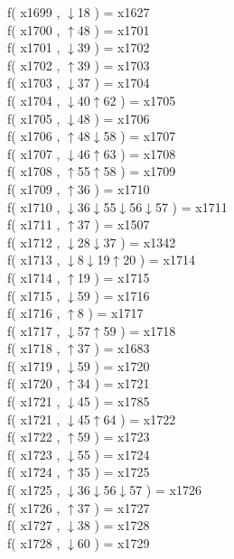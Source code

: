 f( x1699 , $\downarrow$18 ) = x1627 \\
f( x1700 , $\uparrow$48 ) = x1701 \\
f( x1701 , $\downarrow$39 ) = x1702 \\
f( x1702 , $\uparrow$39 ) = x1703 \\
f( x1703 , $\downarrow$37 ) = x1704 \\
f( x1704 , $\downarrow$40$\uparrow$62 ) = x1705 \\
f( x1705 , $\downarrow$48 ) = x1706 \\
f( x1706 , $\uparrow$48$\downarrow$58 ) = x1707 \\
f( x1707 , $\downarrow$46$\uparrow$63 ) = x1708 \\
f( x1708 , $\uparrow$55$\uparrow$58 ) = x1709 \\
f( x1709 , $\uparrow$36 ) = x1710 \\
f( x1710 , $\downarrow$36$\downarrow$55$\downarrow$56$\downarrow$57 ) = x1711 \\
f( x1711 , $\uparrow$37 ) = x1507 \\
f( x1712 , $\downarrow$28$\downarrow$37 ) = x1342 \\
f( x1713 , $\downarrow$8$\downarrow$19$\uparrow$20 ) = x1714 \\
f( x1714 , $\uparrow$19 ) = x1715 \\
f( x1715 , $\downarrow$59 ) = x1716 \\
f( x1716 , $\uparrow$8 ) = x1717 \\
f( x1717 , $\downarrow$57$\uparrow$59 ) = x1718 \\
f( x1718 , $\uparrow$37 ) = x1683 \\
f( x1719 , $\downarrow$59 ) = x1720 \\
f( x1720 , $\uparrow$34 ) = x1721 \\
f( x1721 , $\downarrow$45 ) = x1785 \\
f( x1721 , $\downarrow$45$\uparrow$64 ) = x1722 \\
f( x1722 , $\uparrow$59 ) = x1723 \\
f( x1723 , $\downarrow$55 ) = x1724 \\
f( x1724 , $\uparrow$35 ) = x1725 \\
f( x1725 , $\downarrow$36$\downarrow$56$\downarrow$57 ) = x1726 \\
f( x1726 , $\uparrow$37 ) = x1727 \\
f( x1727 , $\downarrow$38 ) = x1728 \\
f( x1728 , $\downarrow$60 ) = x1729 \\

